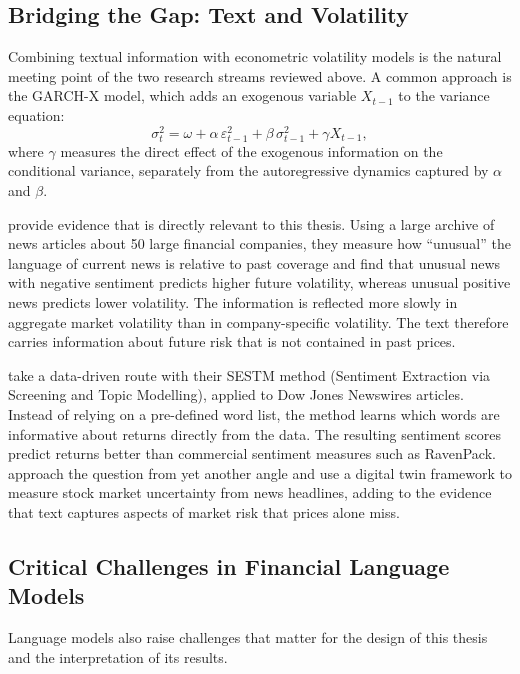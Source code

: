\subsection{Bridging the Gap: Text and Volatility}\label{sec:lit-bridge}
Combining textual information with econometric volatility models is the natural meeting point of the two research streams reviewed above. A common approach is the GARCH-X model, which adds an exogenous variable $X_{t-1}$ to the variance equation:
\begin{equation}
  \sigma^2_t = \omega + \alpha\,\varepsilon^2_{t-1} + \beta\,\sigma^2_{t-1} + \gamma X_{t-1},
\end{equation}
where $\gamma$ measures the direct effect of the exogenous information on the conditional variance, separately from the autoregressive dynamics captured by $\alpha$ and $\beta$.

\textcite{glasserman2019} provide evidence that is directly relevant to this thesis. Using a large archive of news articles about 50 large financial companies, they measure how ``unusual'' the language of current news is relative to past coverage and find that unusual news with negative sentiment predicts higher future volatility, whereas unusual positive news predicts lower volatility. The information is reflected more slowly in aggregate market volatility than in company-specific volatility. The text therefore carries information about future risk that is not contained in past prices.

\textcite{ke2019} take a data-driven route with their SESTM method (Sentiment Extraction via Screening and Topic Modelling), applied to Dow Jones Newswires articles. Instead of relying on a pre-defined word list, the method learns which words are informative about returns directly from the data. The resulting sentiment scores predict returns better than commercial sentiment measures such as RavenPack. \textcite{gutierrez2024} approach the question from yet another angle and use a digital twin framework to measure stock market uncertainty from news headlines, adding to the evidence that text captures aspects of market risk that prices alone miss.

\subsection{Critical Challenges in Financial Language Models}\label{sec:lit-challenges}
Language models also raise challenges that matter for the design of this thesis and the interpretation of its results.

